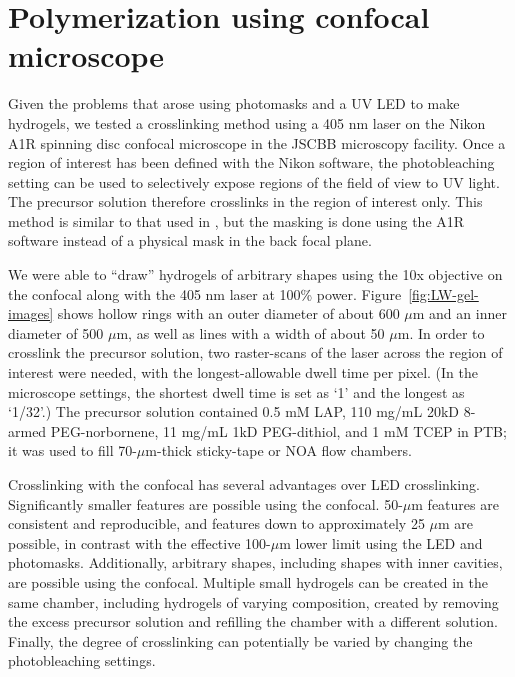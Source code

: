 \section{Polymerization using confocal microscope}
\label{sec:confocal-crosslinking}

Given the problems that arose using photomasks and a UV LED to make hydrogels, we tested a crosslinking method using a 405 nm laser on the Nikon A1R spinning disc confocal microscope in the JSCBB microscopy facility.  Once a region of interest has been defined with the Nikon software, the photobleaching setting can be used to selectively expose regions of the field of view to UV light.  The precursor solution therefore crosslinks in the region of interest only.  This method is similar to that used in \cite{paustian13}, but the masking is done using the A1R software instead of a physical mask in the back focal plane.

We were able to ``draw'' hydrogels of arbitrary shapes using the 10x objective on the confocal along with the 405 nm laser at 100\% power.  Figure~\ref{fig:LW-gel-images} shows hollow rings with an outer diameter of about 600 $\mu$m and an inner diameter of 500 $\mu$m, as well as lines with a width of about 50 $\mu$m.  In order to crosslink the precursor solution, two raster-scans of the laser across the region of interest were needed, with the longest-allowable dwell time per pixel.  (In the microscope settings, the shortest dwell time is set as `1' and the longest as `1/32'.)  The precursor solution contained 0.5 mM LAP, 110 mg/mL 20kD 8-armed PEG-norbornene, 11 mg/mL 1kD PEG-dithiol, and 1 mM TCEP in PTB; it was used to fill 70-$\mu$m-thick sticky-tape or NOA flow chambers.


Crosslinking with the confocal has several advantages over LED crosslinking.  Significantly smaller features are possible using the confocal.  50-$\mu$m features are consistent and reproducible, and features down to approximately 25 $\mu$m are possible, in contrast with the effective 100-$\mu$m lower limit using the LED and photomasks.  Additionally, arbitrary shapes, including shapes with inner cavities, are possible using the confocal.  Multiple small hydrogels can be created in the same chamber, including hydrogels of varying composition, created by removing the excess precursor solution and refilling the chamber with a different solution.  Finally, the degree of crosslinking can potentially be varied by changing the photobleaching settings.


